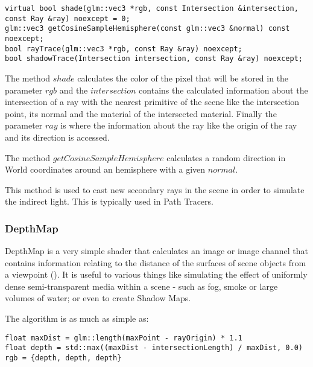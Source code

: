 \begin{lstlisting}[caption={Main methods of Shader}, captionpos=b, label=Shader]
virtual bool shade(glm::vec3 *rgb, const Intersection &intersection, const Ray &ray) noexcept = 0;
glm::vec3 getCosineSampleHemisphere(const glm::vec3 &normal) const noexcept;
bool rayTrace(glm::vec3 *rgb, const Ray &ray) noexcept;
bool shadowTrace(Intersection intersection, const Ray &ray) noexcept;
\end{lstlisting}

\par
The method
$shade$
calculates the color of the pixel that will be stored in the parameter
$rgb$
and the
$intersection$
contains the calculated information about the intersection of a ray with the nearest primitive of the scene like the intersection point, its normal and the material of the intersected material.
Finally the parameter
$ray$
is where the information about the ray like the origin of the ray and its direction is accessed.

\par
The method
$getCosineSampleHemisphere$
calculates a random direction in World coordinates around an hemisphere with a given
$normal$.

This method is used to cast new secondary rays in the scene in order to simulate the indirect light.
This is typically used in Path Tracers.

\subsubsection{DepthMap}

\par
DepthMap is a very simple shader that calculates an image or image channel that contains information relating to the distance of the surfaces of scene objects from a viewpoint (\cite{DepthMap}).
It is useful to various things like simulating the effect of uniformly dense semi-transparent media within a scene - such as fog, smoke or large volumes of water; or even to create Shadow Maps.

The algorithm is as much as simple as:

\begin{lstlisting}[caption={Algorithm of DepthMap Shader}, captionpos=b, label=DepthMap]
float maxDist = glm::length(maxPoint - rayOrigin) * 1.1
float depth = std::max((maxDist - intersectionLength) / maxDist, 0.0)
rgb = {depth, depth, depth}
\end{lstlisting}

